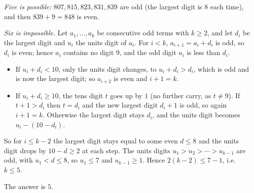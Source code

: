 \emph{Five is possible:} $807,815,823,831,839$ are odd (the largest digit is $8$ each time), and then $839+9=848$ is even.

\emph{Six is impossible.} Let $a_1,\dots,a_k$ be consecutive odd terms with $k\ge2$, and let $d_i$ be the largest digit and $u_i$ the units digit of $a_i$. For $i<k$, $a_{i+1}=a_i+d_i$ is odd, so $d_i$ is even; hence $a_i$ contains no digit $9$, and the odd digit $u_i$ is less than $d_i$.
\begin{itemize}
\item If $u_i+d_i<10$, only the units digit changes, to $u_i+d_i>d_i$, which is odd and is now the largest digit; so $a_{i+2}$ is even and $i+1=k$.
\item If $u_i+d_i\ge10$, the tens digit $t$ goes up by $1$ (no further carry, as $t\ne9$). If $t+1>d_i$ then $t=d_i$ and the new largest digit $d_i+1$ is odd, so again $i+1=k$. Otherwise the largest digit stays $d_i$, and the units digit becomes $u_i-(10-d_i)$.
\end{itemize}
So for $i\le k-2$ the largest digit stays equal to some even $d\le8$ and the units digit drops by $10-d\ge2$ at each step. The units digits $u_1>u_2>\cdots>u_{k-1}$ are odd, with $u_1<d\le8$, so $u_1\le7$ and $u_{k-1}\ge1$. Hence $2(k-2)\le7-1$, i.e. $k\le5$.

The answer is $\boxed{5}$.
